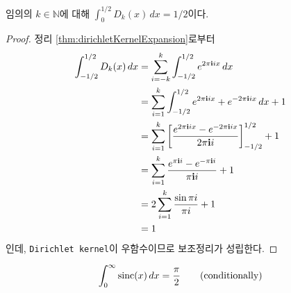\begin{lemma}
    임의의 $k\in\mathbb{N}$에 대해 $\int_0^{1/2}D_k(x)\,dx=1/2$이다.
\end{lemma}

\begin{proof}
    정리 \ref{thm:dirichletKernelExpansion}로부터
    \begin{align*}
        \int_{-1/2}^{1/2}D_k(x)\,dx&=\sum_{i=-k}^k\int_{-1/2}^{1/2}e^{2\pi\mathbf{i} ix}\,dx\\
        &=\sum_{i=1}^k\int_{-1/2}^{1/2}e^{2\pi\mathbf{i} ix}+e^{-2\pi\mathbf{i} ix}\,dx+1\\
        &=\sum_{i=1}^k\bigg[\frac{e^{2\pi\mathbf{i} ix}-e^{-2\pi\mathbf{i} ix}}{2\pi\mathbf{i} i}\bigg]_{-1/2}^{1/2}+1\\
        &=\sum_{i=1}^k\frac{e^{\pi\mathbf{i} i}-e^{-\pi\mathbf{i} i}}{\pi\mathbf{i} i}+1\\
        &=2\sum_{i=1}^k\frac{\sin\pi i}{\pi i}+1\\
        &=1
    \end{align*}
    인데, \texttt{Dirichlet kernel}이 우함수이므로 보조정리가 성립한다.
\end{proof}

\begin{theorem}
    \begin{equation*}
        \int_0^\infty\mathrm{sinc}(x)\,dx=\frac{\pi}{2}\qquad\mathrm{(conditionally)}
    \end{equation*}
\end{theorem}

